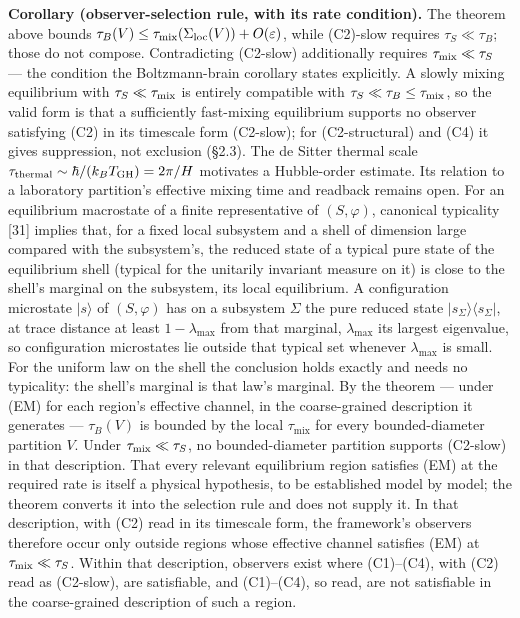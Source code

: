 \documentclass[
]{article}
\begin{document}
\textbf{Corollary (observer-selection rule, with its rate condition).}
The theorem above bounds
\(\tau_B(V)\le\tau_{\rm mix}(\Sigma_{\rm loc}(V))+O(\varepsilon)\),
while (C2)-slow requires \(\tau_S\ll\tau_B\); those do not compose.
Contradicting (C2-slow) additionally requires
\(\tau_{\rm mix}\ll\tau_S\) --- the condition the Boltzmann-brain
corollary states explicitly. A slowly mixing equilibrium with
\(\tau_S\ll\tau_{\rm mix}\) is entirely compatible with
\(\tau_S\ll\tau_B\le\tau_{\rm mix}\), so the valid form is that a
sufficiently fast-mixing equilibrium supports no observer satisfying
(C2) in its timescale form (C2-slow); for (C2-structural) and (C4) it
gives suppression, not exclusion (§2.3). The de Sitter thermal scale
\(\tau_{\rm thermal}\sim\hbar/(k_BT_{\rm GH})=2\pi/H\) motivates a
Hubble-order estimate. Its relation to a laboratory partition's
effective mixing time and readback remains open. For an equilibrium
macrostate of a finite representative of \((S, \varphi)\), canonical
typicality {[}31{]} implies that, for a fixed local subsystem and a
shell of dimension large compared with the subsystem's, the reduced
state of a typical pure state of the equilibrium shell (typical for the
unitarily invariant measure on it) is close to the shell's marginal on
the subsystem, its local equilibrium. A configuration microstate
\(|s\rangle\) of \((S,\varphi)\) has on a subsystem \(\Sigma\) the pure
reduced state \(|s_\Sigma\rangle\langle s_\Sigma|\), at trace distance
at least \(1-\lambda_{\max}\) from that marginal, \(\lambda_{\max}\) its
largest eigenvalue, so configuration microstates lie outside that
typical set whenever \(\lambda_{\max}\) is small. For the uniform law on
the shell the conclusion holds exactly and needs no typicality: the
shell's marginal is that law's marginal. By the theorem --- under (EM)
for each region's effective channel, in the coarse-grained description
it generates --- \(\tau_B(V)\) is bounded by the local
\(\tau_{\text{mix}}\) for every bounded-diameter partition \(V\). Under
\(\tau_{\rm mix}\ll\tau_S\), no bounded-diameter partition supports
(C2-slow) in that description. That every relevant equilibrium region
satisfies (EM) at the required rate is itself a physical hypothesis, to
be established model by model; the theorem converts it into the
selection rule and does not supply it. In that description, with (C2)
read in its timescale form, the framework's observers therefore occur
only outside regions whose effective channel satisfies (EM) at
\(\tau_{\rm mix}\ll\tau_S\). Within that description, observers exist
where (C1)--(C4), with (C2) read as (C2-slow), are satisfiable, and
(C1)--(C4), so read, are not satisfiable in the coarse-grained
description of such a region.
\end{document}
